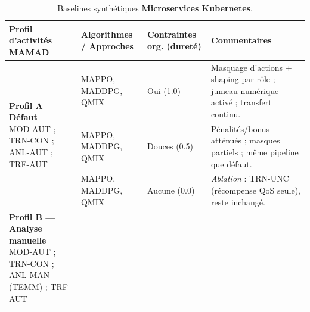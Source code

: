 \begin{table}[h!]
  \centering
  \caption{Baselines synthétiques \textbf{Microservices Kubernetes}.}
  \label{tab:baselines_k8s}
  \renewcommand{\arraystretch}{1.2}
  \tiny
  \begin{tabularx}{\textwidth}{p{4.1cm}p{3.4cm}p{2.7cm}X}
    \toprule
    \textbf{Profil d'activités MAMAD} & \textbf{Algorithmes / Approches}                                                                                                                                                                              & \textbf{Contraintes org. (dureté)} & \textbf{Commentaires}                                                                \\
    \midrule
    \multirow{3}{*}{\parbox{4.1cm}{\textbf{Profil A — Défaut}                                                                                                                                                                                                                                                                                                                     \\MOD-AUT ; TRN-CON ; ANL-AUT ; TRF-AUT}}
                                      & MAPPO, MADDPG, QMIX                                                                                                                                                                                           & Oui (1.0)                          & Masquage d’actions + shaping par rôle ; jumeau numérique activé ; transfert continu. \\
                                      & MAPPO, MADDPG, QMIX                                                                                                                                                                                           & Douces (0.5)                       & Pénalités/bonus atténués ; masques partiels ; même pipeline que défaut.              \\
                                      & MAPPO, MADDPG, QMIX                                                                                                                                                                                           & Aucune (0.0)                       & \textit{Ablation} : TRN-UNC (récompense QoS seule), reste inchangé.                  \\
    \midrule
    \multirow{3}{*}{\parbox{4.1cm}{\textbf{Profil B — Analyse manuelle}                                                                                                                                                                                                                                                                                                           \\MOD-AUT ; TRN-CON ; ANL-MAN (TEMM) ; TRF-AUT}}

\end{tabularx}
\end{table}
